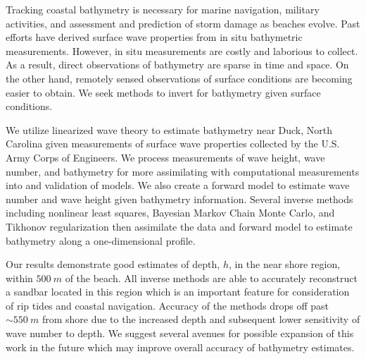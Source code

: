 Tracking coastal bathymetry is necessary for marine navigation, military activities, and assessment and prediction of storm damage as beaches evolve. Past efforts have derived surface wave properties from in situ bathymetric measurements. However, in situ measurements are costly and laborious to collect. As a result, direct observations of bathymetry are sparse in time and space. On the other hand, remotely sensed observations of surface conditions are becoming easier to obtain. We seek methods to invert for bathymetry given surface conditions. 

We utilize linearized wave theory to estimate bathymetry near Duck, North Carolina given measurements of surface wave properties collected by the U.S. Army Corps of Engineers. We process measurements of wave height, wave number, and bathymetry for more assimilating with computational measurements into and validation of models. We also create a forward model to estimate wave number and wave height given bathymetry information. Several inverse methods including nonlinear least squares, Bayesian Markov Chain Monte Carlo, and Tikhonov regularization then assimilate the data and forward model to estimate bathymetry along a one-dimensional profile.

Our results demonstrate good estimates of depth, $h$, in the near shore region, within $500~m$ of the beach. All inverse methods are able to accurately reconstruct a sandbar located in this region which is an important feature for consideration of rip tides and coastal navigation. Accuracy of the methods drops off past $\sim550~m$ from shore due to the increased depth and subsequent lower sensitivity of wave number to depth. We suggest several avenues for possible expansion of this work in the future which may improve overall accuracy of bathymetry estimates.